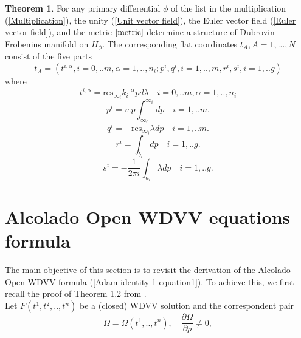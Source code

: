 \documentclass{article}
\theoremstyle{definition}
\newtheorem{theorem}{Theorem}[section]
\begin{document}
\begin{theorem}\label{flatcoord}\cite{B. Dubrovin2}
For any primary differential $\phi$ of the list in \cite{B. Dubrovin2} the multiplication (\ref{Multiplication}), the
unity (\ref{Unit vector field}), the Euler vector field (\ref{Euler vector field}), and the metric $\ref{metric}$ determine a structure of Dubrovin Frobenius manifold on $\tilde H_{\phi}$. The corresponding flat coordinates $t_A, A = 1, . . . ,N$ consist of the five parts
\begin{equation}
t_A=(t^{i,\alpha},i=0,..m,\alpha=1,..,n_i;p^i,q^i,i=1,..,m,r^i,s^i,i=1,..g)
\end{equation}
where
\begin{equation}\label{flat coordinates of Saito metric as periods}
t^{i,\alpha}=\text{res}_{\infty_i} k_i^{-\alpha}pd\lambda             \quad  i=0,..m,\alpha=1,..,n_i
\end{equation}
\begin{equation}
p^{i}=v.p\int_{\infty_0}^{\infty_i}dp             \quad  i=1,..m.
\end{equation}
\begin{equation}
q^{i}=-\text{res}_{\infty_i} \lambda dp         \quad  i=1,..m.
\end{equation}
\begin{equation}
r^{i}=\int_{b_i}dp             \quad  i=1,..g.
\end{equation}
\begin{equation}
s^{i}=-\frac{1}{2\pi i}\int_{a_i} \lambda dp         \quad  i=1,..g.
\end{equation}
\end{theorem}





\section{Alcolado Open WDVV equations formula}

The main objective of this section is to revisit the derivation of the Alcolado Open WDVV formula (\ref{Adam identity 1 equation1}). To achieve this, we first recall the proof of Theorem 1.2 from \cite{Alcolado Adam}.\\


Let  $F(t^1, t^2, .., t^n)$ be a (closed) WDVV solution and the correspondent pair
\begin{equation*}
\Omega=\Omega(t^1,..,t^n), \quad \frac{\partial\Omega}{\partial p}\neq 0,
\end{equation*}
\end{document}
